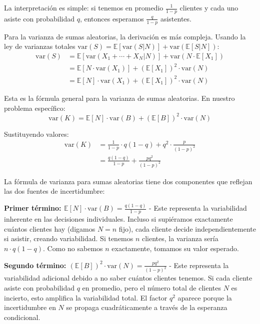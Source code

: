 \documentclass[
  11pt,
  letterpaper,
   addpoints,
  answers
  ]{exam}
\begin{document}
\begin{questions}
\begin{solution}
La interpretación es simple: si tenemos en promedio $\frac{1}{1-p}$ clientes y cada uno asiste con probabilidad $q$, entonces esperamos $\frac{q}{1-p}$ asistentes.

Para la varianza de sumas aleatorias, la derivación es más compleja. Usando la ley de varianzas totales $\text{var}(S) = \mathbb{E}[\text{var}(S|N)] + \text{var}(\mathbb{E}[S|N])$:
\begin{align}
\text{var}(S) &= \mathbb{E}[\text{var}(X_1 + \cdots + X_N | N)] + \text{var}(N \cdot \mathbb{E}[X_1]) \\
&= \mathbb{E}[N \cdot \text{var}(X_1)] + (\mathbb{E}[X_1])^2 \cdot \text{var}(N) \\
&= \mathbb{E}[N] \cdot \text{var}(X_1) + (\mathbb{E}[X_1])^2 \cdot \text{var}(N)
\end{align}

Esta es la fórmula general para la varianza de sumas aleatorias. En nuestro problema específico:
\begin{equation}
\text{var}(K) = \mathbb{E}[N] \cdot \text{var}(B) + (\mathbb{E}[B])^2 \cdot \text{var}(N)
\end{equation}

Sustituyendo valores:
\begin{align}
\text{var}(K) &= \frac{1}{1-p} \cdot q(1-q) + q^2 \cdot \frac{p}{(1-p)^2} \\
&= \frac{q(1-q)}{1-p} + \frac{pq^2}{(1-p)^2}
\end{align}

La fórmula de varianza para sumas aleatorias tiene dos componentes que reflejan las dos fuentes de incertidumbre:

\textbf{Primer término: $\mathbb{E}[N] \cdot \text{var}(B) = \frac{q(1-q)}{1-p}$} - Este representa la variabilidad inherente en las decisiones individuales. Incluso si supiéramos exactamente cuántos clientes hay (digamos $N = n$ fijo), cada cliente decide independientemente si asistir, creando variabilidad. Si tenemos $n$ clientes, la varianza sería $n \cdot q(1-q)$. Como no sabemos $n$ exactamente, tomamos su valor esperado.

\textbf{Segundo término: $(\mathbb{E}[B])^2 \cdot \text{var}(N) = \frac{pq^2}{(1-p)^2}$} - Este representa la variabilidad adicional debido a no saber cuántos clientes tenemos. Si cada cliente asiste con probabilidad $q$ en promedio, pero el número total de clientes $N$ es incierto, esto amplifica la variabilidad total. El factor $q^2$ aparece porque la incertidumbre en $N$ se propaga cuadráticamente a través de la esperanza condicional.


\end{solution}
\end{questions}
\end{document}
